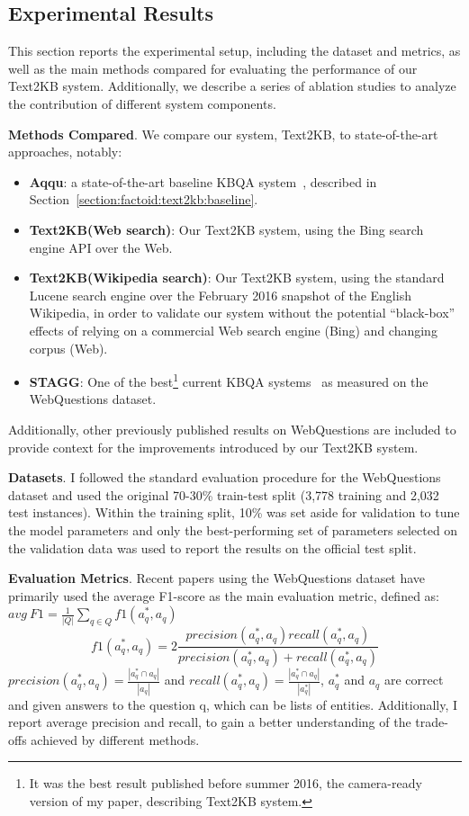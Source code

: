 \subsection{Experimental Results}
\label{section:factoid:text2kb:eval}

This section reports the experimental setup, including the dataset and metrics, as well as the main methods compared for evaluating the performance of our Text2KB system. Additionally, we describe a series of ablation studies to analyze the contribution of different system components.

\textbf{Methods Compared}.
We compare our system, Text2KB, to state-of-the-art approaches, notably:
\begin{itemize}[noitemsep]
\item{\textbf{Aqqu}}: a state-of-the-art baseline KBQA system~\cite{bastmore:cikm:2015:aquu}, described in Section~\ref{section:factoid:text2kb:baseline}.
\item{\textbf{Text2KB(Web search)}}: Our Text2KB system, using the Bing search engine API over the Web. 
\item{\textbf{Text2KB(Wikipedia search)}}: Our Text2KB system, using the standard Lucene search engine over the February 2016 snapshot of the English Wikipedia, in order to validate our system without the potential ``black-box'' effects of relying on a commercial Web search engine (Bing) and changing corpus (Web).
\item{\textbf{STAGG}}: One of the best\footnote{It was the best result published before summer 2016, \ie the camera-ready version of my paper, describing Text2KB system.} current KBQA systems~\cite{yih:ACL:2015:STAGG} as measured on the WebQuestions dataset.
\end{itemize}
Additionally, other previously published results on WebQuestions are included to provide context for the improvements introduced by our Text2KB system.

\textbf{Datasets}.
I followed the standard evaluation procedure for the WebQuestions dataset and used the original 70-30\% train-test split (3,778 training and 2,032 test instances). Within the training split, 10\% was set aside for validation to tune the model parameters and only the best-performing set of parameters selected on the validation data was used to report the results on the official test split.

\textbf{Evaluation Metrics}. 
Recent papers using the WebQuestions dataset have primarily used the average F1-score as the main evaluation metric, defined as:
$avg\ F1 = \frac{1}{|Q|} \sum_{q \in Q} f1(a^*_q, a_q)$
$$f1(a^*_q, a_q) = 2\frac{precision(a^*_q,a_q) recall(a^*_q,a_q)}{precision(a^*_q,a_q) + recall(a^*_q,a_q)}$$
$precision(a^*_q, a_q)=\frac{|a^*_q \cap a_q|}{|a_q|}$ and $recall(a^*_q, a_q) = \frac{|a^*_q \cap a_q|}{|a^*_q|}$, $a^*_q$ and $a_q$ are correct and given answers to the question q, which can be lists of entities.
Additionally, I report average precision and recall, to gain a better understanding of the trade-offs achieved by different methods.

